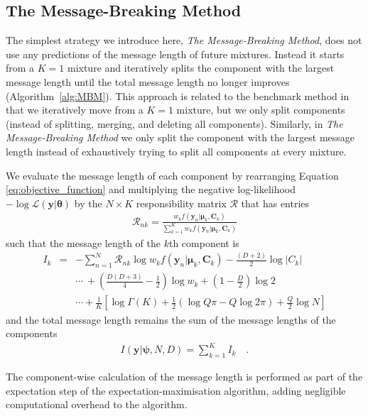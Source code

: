 \documentclass{elsarticle}
\newcommand{\vect}[1]{\boldsymbol{\mathbf{#1}}}
\renewcommand{\vec}[1]{\vect{#1}}
\def\cov{C}
\def\veccov{\vect{\cov}}
\def\vecmean{\vect{\mu}}
\def\vectheta{\vect{\theta}}
\def\weight{w}
\def\datum{y}
\def\data{\vect{\datum}}
\begin{document}
\subsection{The Message-Breaking Method} \label{sec:mbm}
The simplest strategy we introduce here, \emph{The Message-Breaking Method}, does not use any predictions of the message length of future mixtures. Instead it starts from 
a $K=1$ mixture and iteratively splits the component with the largest message length until 
the total message length no longer improves (Algorithm~\ref{alg:MBM}). This approach is related to the benchmark method in that we iteratively move from a $K=1$ mixture, but we only split components (instead of splitting, merging, and deleting all components). Similarly, in \emph{The Message-Breaking Method} we only split the component with the largest message length instead of exhaustively trying to split all components at every mixture.


We evaluate the message length of each component by rearranging Equation \ref{eq:objective_function} and multiplying the negative log-likelihood
$-\log{\mathcal{L}}(\vec\data|\vectheta)$ by the $N \times K$ responsibility matrix $\mathcal{R}$ that has entries
\begin{eqnarray}
	\mathcal{R}_{nk} = \frac{\weight_{k}f(\vec\data_n|\vecmean_k,\veccov_k)}{\sum_{k=1}^{K}\weight_{k}f(\vec\data_n|\vecmean_k,\veccov_k)}
\end{eqnarray}
\noindent{}such that the message length of the $k$th component is
\begin{eqnarray}
	I_k &=& -\sum_{n=1}^{N}\mathcal{R}_{nk}\log{\weight_{k}f(\data_{n}|\vecmean_k,\veccov_k)} -\frac{(D + 2)}{2}\log{|\cov_k|} \nonumber \\
		&& \cdots\ + \left(\frac{D(D+3)}{4}-\frac{1}{2}\right)\log{\weight_k} + \left(1 - \frac{D}{2}\right)\log{2} \nonumber \\
		&& \cdots + \frac{1}{K}\left[\log\Gamma(K) + \frac{1}{2}\left(\log{Q\pi} - Q\log{2\pi}\right) + \frac{Q}{2}\log{N}\right]
\end{eqnarray}
\noindent{}and the total message length remains the sum of the message lengths of the components
\begin{eqnarray}
	I(\vec\data|\vec\psi, N, D) = \sum_{k=1}^{K}I_{k} \quad .
\end{eqnarray}

The component-wise calculation of the message length is performed as part of the 
expectation step of the expectation-maximisation algorithm, adding negligible computational overhead to the algorithm.
\end{document}
